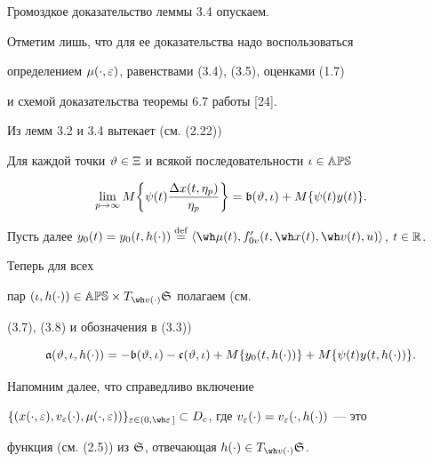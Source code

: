 Громоздкое доказательство леммы 3.4 опускаем.


Отметим лишь, что для ее доказательства надо воспользоваться


определением $\mu(\cdot,\varepsilon)$, равенствами (3.4), (3.5), оценками (1.7)


и схемой доказательства теоремы 6.7 работы [24].





Из лемм 3.2 и 3.4 вытекает (см. (2.22))





\begin{lems}


Для каждой точки $\vartheta\in\Xi$ и всякой последовательности $\iota\in\Bbb{APS}$


$$


\lim_{p\to\infty}M\bigg\{\psi(t)\frac{\Dl


x(t,\eta_{p})}{\eta_{p}}\bigg\}= \frak b(\vt,\iota)+M\{\psi(t)y(t)\}.


$$


\end{lems}





Пусть далее $y_{0}(t)=y_{0}(t,h(\cdot))\overset{\mathrm{def}}{=}{}\la


\wh\mu(t),f'_{0v}(t,\wh x(t),\wh v(t),u)\ra$, $t\in\Bbb R$.


Теперь для всех


пар $(\iota,h(\cdot))\in\Bbb{APS}\times T_{\wh v(\cdot)}\gS$ полагаем (см.


(3.7), (3.8) и обозначения в (3.3))


\begin{equation}


\frak a(\vt,\iota,h(\cdot))=-\frak b(\vt,\iota)-\frak c(\vt,\iota)+


M\{y_{0}(t,h(\cdot))\}+M\{\psi(t)y(t,h(\cdot))\}.


\end{equation}





Напомним далее, что справедливо включение


$\{(x(\cdot,\ve),v_{\ve}(\cdot),\mu(\cdot,\ve))\}_{\ve\in(0,\wh\ve\,]}


\subset D_{c}$, где $v_{\ve}(\cdot)=v_{\ve}(\cdot,h(\cdot))$ --- это


функция (см. (2.5)) из $\frak S$, отвечающая $h(\cdot)\in T_{\wh v(\cdot)}\gS$.


